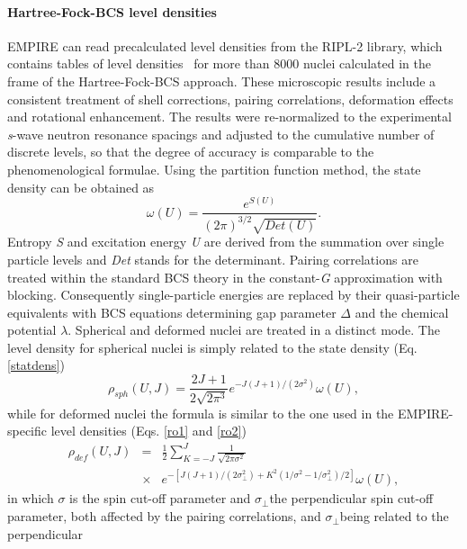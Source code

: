 \documentclass[twocolumn,amsmath,amssymb,10pt,groupedaddress,a4paper]{revtex4}
\begin{document}
\paragraph{Hartree-Fock-BCS level densities}
EMPIRE can read precalculated level densities
from the RIPL-2 library, which contains tables of level
densities~\cite{HFBCS} for more than 8000 nuclei calculated in the
frame of the Hartree-Fock-BCS approach. These microscopic results
include a consistent treatment of shell corrections, pairing correlations,
deformation effects and rotational enhancement. The results were re-normalized
to the experimental \emph{s}-wave neutron resonance spacings and adjusted
to the cumulative number of discrete levels, so that the degree of
accuracy is comparable to the phenomenological formulae.
Using the partition function method, the state density can be obtained
as
\begin{equation}
\omega(U)=\frac{e^{S(U)}}{(2\pi)^{3/2}\sqrt{Det(U)}}.
\label{statdens}
\end{equation}
 Entropy \emph{S} and excitation energy \emph{U} are derived from
the summation over single particle levels and \emph{Det} stands for
the determinant. Pairing correlations are treated within the standard
BCS theory in the constant-\emph{G} approximation with blocking. Consequently
single-particle energies are replaced by their quasi-particle equivalents
with BCS equations determining gap parameter $\Delta$
and the chemical potential $\lambda$. Spherical and deformed nuclei
are treated in a distinct mode. The level density
for spherical nuclei is simply related to the state density (Eq. \ref{statdens})
\begin{equation}
\rho_{sph}(U,J)=\frac{2J+1}{2\sqrt{2\pi^{3}}}e^{-J(J+1)/(2\sigma^{2})}\omega(U),
\label{rhosph}
\end{equation}
while for deformed nuclei the formula is similar to the one used in
the EMPIRE-specific level densities (Eqs. \ref{ro1} and \ref{ro2})
\begin{eqnarray}
\rho_{def}(U,J)&=&\frac{1}{2}\sum_{K=-J}^{J}\frac{1}{\sqrt{2\pi\sigma^{2}}}\\
&\times&e^{-[J(J+1)/(2\sigma_{\bot}^{2})+K^{2}(1/\sigma^{2}-1/\sigma_{\perp}^{2})/2]}\omega(U),\nonumber
\label{rhodef}
\end{eqnarray}
in which $\sigma$ is the spin cut-off parameter and $\sigma_{\perp}$the
perpendicular spin cut-off parameter, both affected by the pairing
correlations, and $\sigma_{\perp}$being related to the perpendicular
\end{document}
